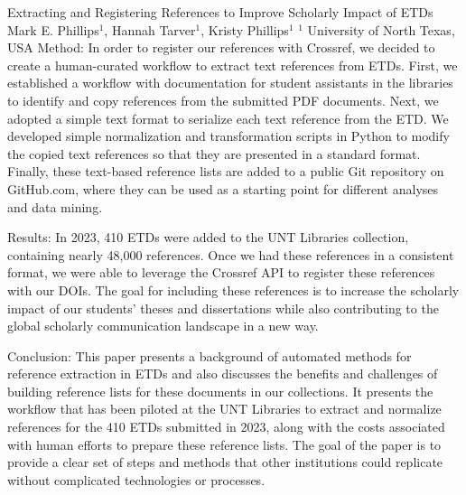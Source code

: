 \begin{abstract_online}{Extracting and Registering References to Improve Scholarly Impact of ETDs}{%
    Mark E. Phillips$^{1}$, Hannah Tarver$^{1}$, Kristy Phillips$^{1}$}{%
    }{%
    $^1$ University of North Texas, USA
}
Method: In order to register our references with Crossref, we decided to create a human-curated workflow to extract text references from ETDs. First, we established a workflow with documentation for student assistants in the libraries to identify and copy references from the submitted PDF documents. Next, we adopted a simple text format to serialize each text reference from the ETD. We developed simple normalization and transformation scripts in Python to modify the copied text references so that they are presented in a standard format. Finally, these text-based reference lists are added to a public Git repository on GitHub.com, where they can be used as a starting point for different analyses and data mining.

Results: In 2023, 410 ETDs were added to the UNT Libraries collection, containing nearly 48,000 references. Once we had these references in a consistent format, we were able to leverage the Crossref API to register these references with our DOIs. The goal for including these references is to increase the scholarly impact of our students' theses and dissertations while also contributing to the global scholarly communication landscape in a new way.

Conclusion: This paper presents a background of automated methods for reference extraction in ETDs and also discusses the benefits and challenges of building reference lists for these documents in our collections. It presents the workflow that has been piloted at the UNT Libraries to extract and normalize references for the 410 ETDs submitted in 2023, along with the costs associated with human efforts to prepare these reference lists. The goal of the paper is to provide a clear set of steps and methods that other institutions could replicate without complicated technologies or processes.

\end{abstract_online}

